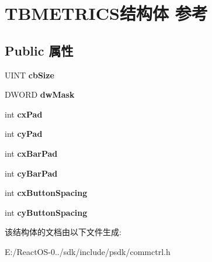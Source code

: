 \hypertarget{struct_t_b_m_e_t_r_i_c_s}{}\section{T\+B\+M\+E\+T\+R\+I\+C\+S结构体 参考}
\label{struct_t_b_m_e_t_r_i_c_s}
\subsection*{Public 属性}
\begin{DoxyCompactItemize}
\item 
\mbox{\label{struct_t_b_m_e_t_r_i_c_s_a70ae487cd34f595b1f4d292dd204340e}} 
U\+I\+NT {\bfseries cb\+Size}
\item 
\mbox{\label{struct_t_b_m_e_t_r_i_c_s_a420b2a2a009633d26c0c228eb2a19fec}} 
D\+W\+O\+RD {\bfseries dw\+Mask}
\item 
\mbox{\label{struct_t_b_m_e_t_r_i_c_s_adf6a44f59e356ef8e68f4bb6f1c16ff9}} 
int {\bfseries cx\+Pad}
\item 
\mbox{\label{struct_t_b_m_e_t_r_i_c_s_aa64eb5c281c01b93e848f40aecb19785}} 
int {\bfseries cy\+Pad}
\item 
\mbox{\label{struct_t_b_m_e_t_r_i_c_s_a2903469b82d541afe577879f9ec13235}} 
int {\bfseries cx\+Bar\+Pad}
\item 
\mbox{\label{struct_t_b_m_e_t_r_i_c_s_a46570ed03ab44e1f1e4f261f9ea8ba7f}} 
int {\bfseries cy\+Bar\+Pad}
\item 
\mbox{\label{struct_t_b_m_e_t_r_i_c_s_a1a05bc0bc14a897188da0dd465e5d39a}} 
int {\bfseries cx\+Button\+Spacing}
\item 
\mbox{\label{struct_t_b_m_e_t_r_i_c_s_a091e681bc03b536695c8828bcc18acd7}} 
int {\bfseries cy\+Button\+Spacing}
\end{DoxyCompactItemize}


该结构体的文档由以下文件生成\+:\begin{DoxyCompactItemize}
\item 
E\+:/\+React\+O\+S-\/0../sdk/include/psdk/commctrl.\+h\end{DoxyCompactItemize}
